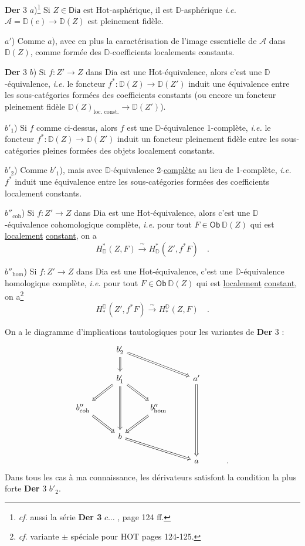 \documentclass[11pt]{article}
\newcommand{\printedpage}[1]{\marginpar{\footnotesize p.~#1}}
\newcommand{\msp}[1]{\marginpar{\footnotesize [#1]}}
\newcommand{\HOT}{\textsf{HOT}}
\newcommand{\Hot}{\textsf{Hot}}
\newcommand{\Dia}{\textsf{Dia}}
\newcommand{\DD}{\mathbb{D}}
\begin{document}
\textbf{Der} 3 $a$)\footnote[58]{\textit{cf.} aussi la série \textbf{Der 3} $c \ldots$ , page 124 ff.} Si $Z \in \mathsf{Dia}$ est \Hot-asphérique, il est $\DD$-asphérique \textit{i.e.} $\mathcal{A} = \DD(e) \to \DD(Z)$ est pleinement fidèle. %

$a'$) Comme $a$), avec en plus la caractérisation de l'image essentielle de $\mathcal{A}$ dans $\DD(Z)$, comme formée des $\DD$-coefficients localements constants. %

\textbf{Der} 3 $b$) Si $f : Z' \to Z$ dans \Dia{} est une \Hot-équivalence, alors c'est une $\DD$-équivalence, \textit{i.e.} le foncteur $f^{*} : \DD(Z) \to \DD(Z')$ induit une équivalence entre les sous-catégories formées des coefficients constants (ou encore un foncteur pleinement fidèle $\DD(Z)_{\text{loc. const.}} \longrightarrow \DD(Z')$).

$b'_1$) Si $f$ comme ci-dessus, alors $f$ est une $\DD$-équivalence 1-complète, \textit{i.e.} le foncteur $f^{*} : \DD(Z) \to \DD(Z')$ induit un foncteur pleinement fidèle
\msp{page 112}
entre les sous-catégories pleines formées des objets localement constants.

$b'_2$) Comme $b'_1$), mais avec $\DD$-équivalence 2-\underline{complète} au lieu de 1-complète, \textit{i.e.} $f^{*}$ induit une équivalence entre les sous-catégories formées des coefficients localement constants.

$b''_{\mathrm{coh}}$) Si $f : Z' \to Z$ dans \Dia{} est une \Hot-équivalence, alors c'est une $\DD$-équivalence cohomologique complète, \textit{i.e.} pour tout $F \in \mathsf{Ob}\ \DD(Z)$ qui est \underline{localement} \underline{constant}, on a
\[ H^{*}_{\DD}(Z,F) \xrightarrow{\ \sim\ } H^{*}_{\DD}(Z',f^{*}F) \quad . \]

$b''_{\mathrm{hom}}$) Si $f : Z' \to Z$ dans \Dia{} est une \Hot-équivalence, c'est une $\DD$-équivalence homologique complète, \textit{i.e.} pour tout $F \in \mathsf{Ob}\ \DD(Z)$ qui est \underline{localement} \underline{constant}, on a\footnote[59]{\textit{cf.} variante $\pm$ spéciale pour \HOT{} pages 124-125.}
\[ H_{*}^{\DD}(Z',f^{*}F) \xrightarrow{\ \sim\ } H_{*}^{\DD}(Z,F) \quad . \]

\printedpage{67}

On a le diagramme d'implications tautologiques pour les variantes de \textbf{Der} 3 :
\[
\begin{tikzcd}
 & b'_2 \arrow[d, Rightarrow] \arrow[drr, Rightarrow] & & & \\
 & b'_1 \arrow[dl, Rightarrow] \arrow[dr, Rightarrow] \arrow[dd, Rightarrow] & & a' \arrow[ddd, Rightarrow] & \\
b''_{\mathrm{coh}} \arrow[dr, Rightarrow] & & b''_{\mathrm{hom}} \arrow[dl, Rightarrow] & & \\
 & b \arrow[drr, Rightarrow] & & & \\
 & & & a & .
\end{tikzcd}
\]
Dans tous les cas à ma connaissance, les dérivateurs satisfont la condition la plus forte \textbf{Der} 3 $b'_2$.
\msp{page 113}
\end{document}
